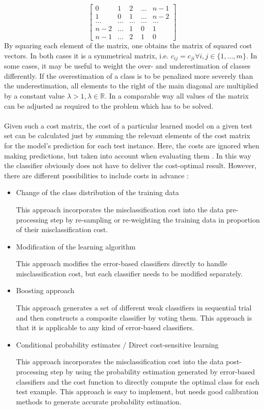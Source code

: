 \documentclass[article,type=msc,colorback,accentcolor=tud7b]{tudthesis}
\begin{document}
    \[\left[ \begin{array}{ccccc}
    {0} & {1} & {2} & {\dots} & {n-1} \\
    {1} & {0} & {1} & {\dots} & {n-2} \\
    {\dots} & {\dots} & {\dots} & {\dots} & {\dots} \\
    {n-2} & {\dots} & {1} & {0} & {1} \\
    {n-1} & {\dots} & {2} & {1} & {0}
    \end{array}\right]\]
    By squaring each element of the matrix, one obtains the matrix of squared cost vectors. In both cases it is a symmetrical matrix, i.e. $c_{ij}=c_{ji}\forall i,j\in\{1, \dots, m\}$. In some cases, it may be useful to weight the over- and underestimation of classes differently. If the overestimation of a class is to be penalized more severely than the underestimation, all elements to the right of the main diagonal are multiplied by a constant value $\lambda>1,\lambda\in\mathbb{R}$. In a comparable way all values of the matrix can be adjusted as required to the problem which has to be solved. \\\\
    Given such a cost matrix, the cost of a particular learned model on a given test set can be calculated just by summing the relevant elements of the cost matrix for the model’s prediction for each test instance. Here, the costs are ignored when making predictions, but taken into account when evaluating them \autocite[section~5.7]{Witten2005}. In this way the classifier obviously does not have to deliver the cost-optimal result. However, there are different possibilities to include costs in advance \autocite[section~2.3]{Qin2010}:
    \begin{itemize}
      \item Change of the class distribution of the training data
        
        This approach incorporates the misclassification cost into the data pre-processing step by re-sampling or re-weighting the training data in proportion of their misclassification cost.
      \item Modification of the learning algorithm
        
        This approach modifies the error-based classifiers directly to handle misclassification cost, but each classifier needs to be modified separately.
      \item Boosting approach
        
        This approach generates a set of different weak classifiers in sequential trial and then constructs a composite classifier by voting them. This approach is that it is applicable to any kind of error-based classifiers.
      \item Conditional probability estimates / Direct cost-sensitive learning
        
        This approach incorporates the misclassification cost into the data post-processing step by using the probability estimation generated by error-based classifiers and the cost function to directly compute the optimal class for each test example. This approach is easy to implement, but needs good calibration methods to generate accurate probability estimation.
    \end{itemize}
\end{document}
